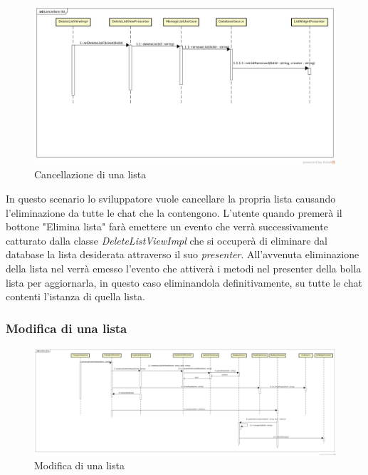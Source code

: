 \label{Cancellazione di una lista}
\begin{figure}[H]
	\centering
	\includegraphics[width=\textwidth]{Sezioni/Diagrammi/img_app/cancellare_lista.jpg}
	\caption{Cancellazione di una lista}
\end{figure}

In questo scenario lo sviluppatore vuole cancellare la propria lista causando l'eliminazione da tutte le chat che la contengono. L'utente quando premerà il bottone "Elimina lista" farà emettere un evento che verrà successivamente catturato dalla classe \textit{DeleteListViewImpl} che si occuperà di eliminare dal database la lista desiderata attraverso il suo \textit{presenter}. All'avvenuta eliminazione della lista nel  verrà emesso l'evento che attiverà i metodi nel presenter della bolla lista per aggiornarla, in questo caso eliminandola definitivamente, su tutte le chat contenti l'istanza di quella lista. 

\subsubsection{Modifica di una lista}

\label{Modifca di un lista}
\begin{figure}[H]
	\centering
	\includegraphics[width=\textwidth]{Sezioni/Diagrammi/img_app/modifica_lista.jpg}
	\caption{Modifica di una lista}
\end{figure}

